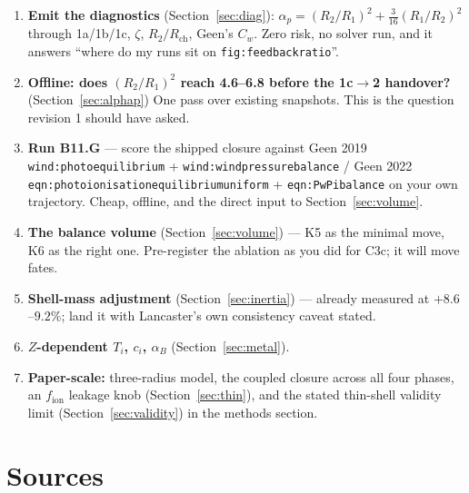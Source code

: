\documentclass[11pt,a4paper,oneside]{report}
\newcommand{\brkus}{\textunderscore\allowbreak}
\newcommand{\lbl}[1]{\texttt{\footnotesize\let\_\brkus #1}}
\newcommand{\Rch}{R_{\mathrm{ch}}}
\newcommand{\ap}{\alpha_p}
\newcommand{\ci}{c_i}
\begin{document}
\begin{enumerate}
\item \textbf{Emit the diagnostics} (Section~\ref{sec:diag}):
      $\ap=(R_2/R_1)^2+\tfrac3{16}(R_1/R_2)^2$ through 1a/1b/1c, $\zeta$, $R_2/\Rch$, Geen's
      $C_w$. Zero risk, no solver run, and it answers ``where do my runs sit on
      \lbl{fig:feedback\_ratio}''.
\item \textbf{Offline: does $(R_2/R_1)^2$ reach 4.6--6.8 before the 1c$\to$2 handover?}
      (Section~\ref{sec:alphap}) One pass over existing snapshots. This is the question
      revision 1 should have asked.
\item \textbf{Run B11.G} --- score the shipped closure against Geen 2019
      \lbl{wind:photoequilibrium} + \lbl{wind:windpressurebalance} / Geen 2022
      \lbl{eqn:photoionisation\_equilibrium\_uniform} + \lbl{eqn:PwPibalance} on your own
      trajectory. Cheap, offline, and the direct input to Section~\ref{sec:volume}.
\item \textbf{The balance volume} (Section~\ref{sec:volume}) --- K5 as the minimal move, K6
      as the right one. Pre-register the ablation as you did for C3c; it will move fates.
\item \textbf{Shell-mass adjustment} (Section~\ref{sec:inertia}) --- already measured at
      $+8.6$--$9.2\%$; land it with Lancaster's own consistency caveat stated.
\item \textbf{$Z$-dependent $T_i$, $\ci$, $\alpha_B$} (Section~\ref{sec:metal}).
\item \textbf{Paper-scale:} three-radius model, the coupled closure across all four phases,
      an $f_{\mathrm{ion}}$ leakage knob (Section~\ref{sec:thin}), and the stated thin-shell
      validity limit (Section~\ref{sec:validity}) in the methods section.
\end{enumerate}

\section*{Sources}
\end{document}
